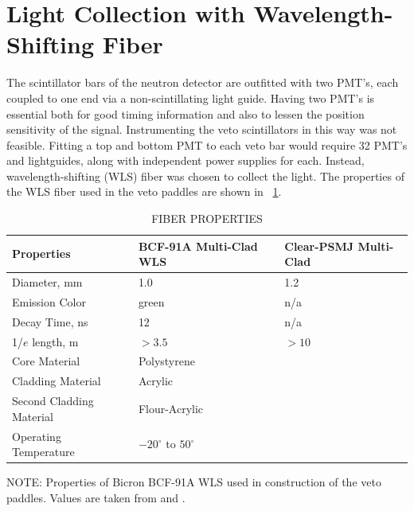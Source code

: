 \section{Light Collection with Wavelength-Shifting Fiber}

The scintillator bars of the neutron detector are outfitted with two PMT's, each coupled to one end via a non-scintillating light guide.  Having two PMT's is essential both for good timing information and also to lessen the position sensitivity of the signal.  Instrumenting the veto scintillators in this way was not feasible.  Fitting a top and bottom PMT to each veto bar would require 32 PMT's and lightguides, along with independent power supplies for each.  Instead, wavelength-shifting (WLS) fiber was chosen to collect the light.  The properties of the WLS fiber used in the veto paddles are shown in {\tab}~\ref{tab:WLS_Kuraray}.
\begin{table}[htp]
\centering
\caption[\uppercase{fiber properties}]{\uppercase{fiber properties}}
\label{tab:WLS_Kuraray}
\begin{tabular}{lll}
Properties & BCF-91A Multi-Clad WLS & Clear-PSMJ Multi-Clad\\
\hline
Diameter, mm & 1.0 & 1.2\\
Emission Color & green & n/a\\
Decay Time, ns & 12 & n/a\\
1/$e$ length, m & $>3.5$ & $>10$\\
Core Material & Polystyrene & \\
Cladding Material & Acrylic & \\
Second Cladding Material & Flour-Acrylic \\
Operating Temperature & $-20^{\circ}$ to $50^{\circ}$ & \\
\end{tabular}
\begin{flushleft}
\small NOTE:
Properties of Bicron BCF-91A WLS used in construction of the veto paddles.  Values are taken from \citep{BCF-91A} and \citep{kuraray}.
\end{flushleft}
\end{table}

